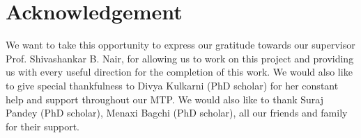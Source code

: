 \newpage
\chapter*{\centering Acknowledgement}
\large We want to take this opportunity to express our gratitude towards our supervisor Prof. Shivashankar B. Nair, for allowing us to work on this project and providing us with every useful direction for the completion of this work. We would also like to give special thankfulness to Divya Kulkarni (PhD scholar) for her constant help and support throughout our MTP. We would also like to thank Suraj Pandey (PhD scholar), Menaxi Bagchi (PhD scholar), all our friends and family for their support.
